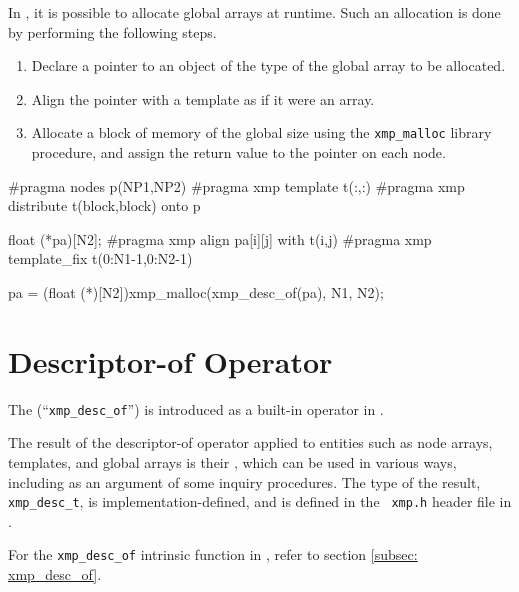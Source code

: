 In {\XMPC}, it is possible to allocate global arrays at runtime.
%
Such an allocation is done by performing the following steps.
%
\begin{enumerate}
 \item Declare a pointer to an object of the type of the global array to
       be allocated.
 \item Align the pointer with a template as if it were an array.
 \item Allocate a block of memory of the global size using the {\tt xmp\_malloc}
       library procedure, and assign the return value to the
       pointer on each node.
\end{enumerate}

\begin{XCexample}
#pragma nodes p(NP1,NP2)
#pragma xmp template t(:,:)
#pragma xmp distribute t(block,block) onto p

float (*pa)[N2];
#pragma xmp align pa[i][j] with t(i,j)
#pragma xmp template_fix t(0:N1-1,0:N2-1)

pa = (float (*)[N2])xmp_malloc(xmp_desc_of(pa), N1, N2);
\end{XCexample}

\section{Descriptor-of Operator}
\label{sec:Descriptor of Global Data in C}


The  (``{\tt xmp\_desc\_of}'') is
introduced as a built-in operator in {\XMPC}.

The result of the descriptor-of operator applied to {\XMP} entities such
as node arrays, templates, and global arrays is their {\it
{}}, which can be used in various ways, including as an
argument of some inquiry procedures. The type of the result, {\tt
xmp\_desc\_t}, is implementation-defined, and is defined in the {\tt
xmp.h} header file in {\XMPC}.

For the {\tt xmp\_desc\_of} intrinsic function in {\XMPF}, refer to
section \ref{subsec: xmp_desc_of}.

